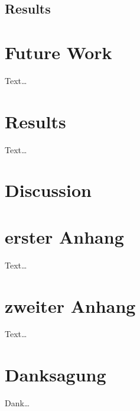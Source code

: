 \documentclass[master,       %
               twoside,        %
               BCOR10mm,       %
               ngerman,english  %
               ]{GAUBM_astro}
\begin{document}
\section{Results}

\chapter{Future Work}



Text\dots
\chapter{Results}
Text\dots
\chapter{Discussion}


\appendix
\chapter{erster Anhang}
Text\dots
\chapter{zweiter Anhang}
Text\dots

\cleardoublepage
 

\chapter*{Danksagung}
Dank\dots

\Declaration
\end{document}
